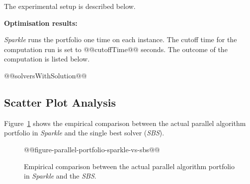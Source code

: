 \documentclass[british]{article}
\newif\ifdecision
\begin{document}
The experimental setup is described below.

\ifdecision \textbf{Performance computation:}
\else \textbf{Optimisation results:}
\fi
\emph{Sparkle} runs the portfolio one time on each instance. The cutoff time for the computation run is set to @@cutoffTime@@ seconds. The outcome of the computation is listed below.
\ifdecision
The scores of the outcomes are calculated according to @@performanceMetric@@, this means that for each instance the solver which solved the instance is scored its runtime and the remaining solvers are scored the runtime times ten. If however the portfolio reaches the cutofftime, which means that no solvers solved the instance, all solvers are scored the cutofftime times ten.
\fi

\begin{enumerate}
@@solversWithSolution@@
\end{enumerate}
\ifdecision
In the table below the computed @@performanceMetric@@ scores of all solvers have been listed aswell as for the parallel algorithm portfolio itself.
\begin{table}[ht]
@@resultsTable@@
\end{table}
\fi
\subsection{Scatter Plot Analysis}
\label{sec:Scatter_Plot_Analysis}

Figure~\ref{fig:sparkle_vs_sbs} shows the empirical comparison between the actual parallel algorithm portfolio in \emph{Sparkle} and the single best solver (\emph{SBS}).

\begin{figure}[htbp]
\noindent \begin{centering}
    @@figure-parallel-portfolio-sparkle-vs-sbs@@
\par\end{centering}

\caption{Empirical comparison between the actual parallel algorithm portfolio in \emph{Sparkle} and the \emph{SBS}.}\label{fig:sparkle_vs_sbs}
\end{figure}



\end{document}
